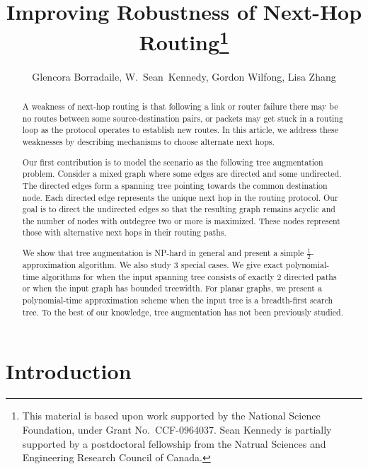 \documentclass{article}
\begin{document}
\title{Improving Robustness of Next-Hop Routing\thanks{This material is based upon work supported by the National Science
  Foundation, under Grant No.\ CCF-0964037.  Sean Kennedy is partially supported by a postdoctoral fellowship from the Natrual Sciences and Engineering Research Council of Canada.}}

\author{
Glencora Borradaile, W.~Sean~Kennedy, Gordon Wilfong, Lisa Zhang
}




\maketitle




\begin{abstract}
A weakness of next-hop routing is that following a link or router failure there may be no routes between some source-destination pairs, or packets may get stuck in a routing loop as the protocol operates to establish new routes.
In this article, we address these weaknesses by describing mechanisms to choose alternate next hops.

Our first contribution is to model the scenario as the following {\sc tree
augmentation} problem.  Consider a mixed graph where some edges are
directed and some undirected.  The directed edges form a spanning tree
pointing towards the common destination node. Each directed edge
represents the unique next hop in the routing protocol.  Our goal is
to direct the undirected edges so that the resulting graph remains
acyclic and the number of nodes with outdegree two or more is
maximized.  These nodes represent those with alternative next hops
in their routing paths.

We show that {\sc tree augmentation} is NP-hard in general and present
a simple $\frac{1}{2}$-approximation algorithm.  We also study 3 special
cases.  We give exact polynomial-time algorithms for when the input spanning tree consists of exactly 2 directed
paths or when the input graph has bounded treewidth.  For planar graphs, we present a
polynomial-time approximation scheme when the input tree is a
breadth-first search tree. To the best of our knowledge, {\sc tree
  augmentation} has not been previously studied.

\end{abstract}

\section{Introduction}
\end{document}
